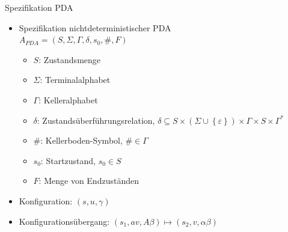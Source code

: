 \begin{frame}{Spezifikation PDA}
	\begin{itemize}
		\item Spezifikation nichtdeterministischer PDA\\
		$A_{PDA}=(S, \Sigma, \Gamma, \delta, s_0, \#, F)$
		\begin{itemize}
			\item $S$: Zustandsmenge
			\item $\Sigma$: Terminalalphabet
			\item $\Gamma$: Kelleralphabet
			\item $\delta$: Zustandsüberführungsrelation, $\delta \subseteq S \times \left(\Sigma \cup \left\{\varepsilon\right\}\right) \times \Gamma \times S \times \Gamma^*$
			\item $\#$: Kellerboden-Symbol, $\# \in \Gamma$
			\item $s_0$: Startzustand, $s_0 \in S$
			\item $F$: Menge von Endzuständen
		\end{itemize}
		\item Konfiguration: $(s, u, \gamma)$
		\item Konfigurationsübergang: $(s_1, av, A\beta) \mapsto (s_2, v, \alpha\beta)$
	\end{itemize}
	\centering
\end{frame}

